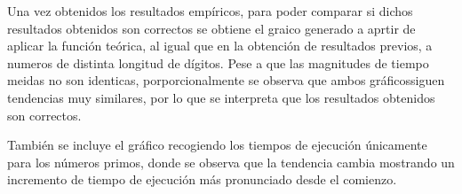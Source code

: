 \begin{figure}[H]
\end{figure}

Una vez obtenidos los resultados empíricos, para poder comparar si dichos resultados obtenidos son correctos se obtiene el graico generado a aprtir de aplicar la función teórica, al igual que en la obtención de resultados previos, a numeros de distinta longitud de dígitos. Pese a que las magnitudes de tiempo meidas no son identicas, porporcionalmente se observa que ambos gráficossiguen tendencias muy similares, por lo que se interpreta que los resultados obtenidos son correctos.

\begin{figure}[H]
\end{figure}

También se incluye el gráfico recogiendo los tiempos de ejecución únicamente para los números primos, donde se observa que la tendencia cambia mostrando un incremento de tiempo de ejecución más pronunciado desde el comienzo.
\begin{figure}[H]
\end{figure}

